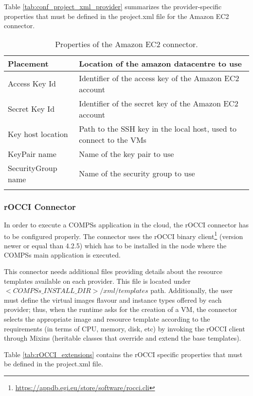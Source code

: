 Table \ref{tab:conf_project_xml_provider} summarizes the provider-specific properties that must be 
defined in the project.xml file for the Amazon EC2 connector.

\begin{longtable}{| p{} | p{} |}
\hline
{\bf Placement }    &   Location of the amazon datacentre to use \\
\hline
Access Key Id       &   Identifier of the access key of the Amazon EC2 account \\
\hline
Secret Key Id       &   Identifier of the secret key of the Amazon EC2 account \\
\hline
Key host location   &   Path to the SSH key in the local host, used to connect to the VMs \\
\hline
KeyPair name        &   Name of the key pair to use \\
\hline
SecurityGroup name  &   Name of the security group to use \\
\hline
\caption{Properties of the Amazon EC2 connector.}
\label{tab:ec2_connector_properties}
\end{longtable}

\vspace{-1.0cm}

\subsubsection{rOCCI Connector}
In order to execute a COMPSs application in the cloud, the rOCCI connector has to be configured properly. 
The connector uses the rOCCI binary client\footnote{\url{https://appdb.egi.eu/store/software/rocci.cli}} 
(version newer or equal than 4.2.5) which has to be installed in the node where the COMPSs main 
application is executed.

This connector needs additional files providing details about the resource templates available on 
each provider. This file is located under $<COMPSs\_INSTALL\_DIR>/xml/templates$ path. 
Additionally, the user must define the virtual images flavour and instance types offered by each provider; 
thus, when the runtime asks for the creation of a VM, the connector selects the appropriate image and 
resource template according to the requirements (in terms of CPU, memory, disk, etc) by invoking the 
rOCCI client through Mixins (heritable classes that override and extend the base templates).

Table \ref{tab:rOCCI_extensions} contains the rOCCI specific properties that must be defined in the 
project.xml file.


